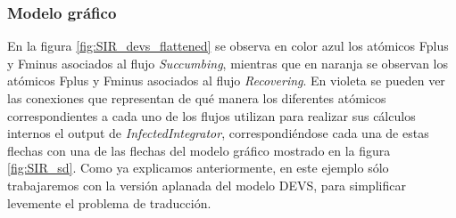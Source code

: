 \subsubsection{Modelo gráfico}
En la figura \ref{fig:SIR_devs_flattened} se observa en color azul los atómicos Fplus y Fminus asociados al flujo \textit{Succumbing}, mientras que en naranja se observan los atómicos Fplus y Fminus asociados al flujo \textit{Recovering}. En violeta se pueden ver las conexiones que representan de qué manera los diferentes atómicos correspondientes a cada uno de los flujos utilizan para realizar sus cálculos internos el output de \textit{InfectedIntegrator}, correspondiéndose cada una de estas flechas con una de las flechas del modelo gráfico mostrado en la figura \ref{fig:SIR_sd}. Como ya explicamos anteriormente, en este ejemplo sólo trabajaremos con la versión aplanada del modelo DEVS, para simplificar levemente el problema de traducción. 

